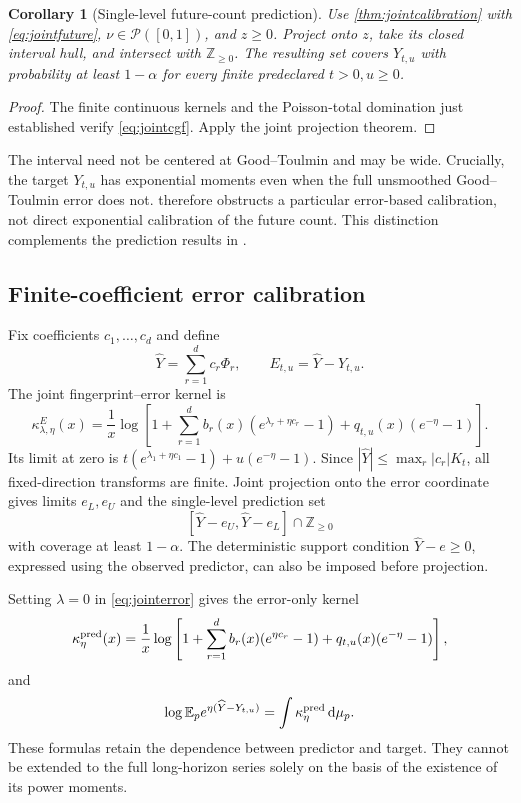 \documentclass[11pt]{article}
\numberwithin{equation}{section}
\newtheorem{corollary}[corollary]{Corollary}
\theoremstyle{definition}
\theoremstyle{remark}
\newcommand{\E}{\mathbb E}
\newcommand{\Prob}{\mathcal P}
\newcommand{\dd}{\,\mathrm d}
\begin{document}
\begin{corollary}[Single-level future-count prediction]\label{cor:jointfuture}
Use \cref{thm:jointcalibration} with \eqref{eq:jointfuture}, $\nu\in\Prob([0,1])$, and $z\ge0$. Project onto $z$, take its closed interval hull, and intersect with $\mathbb Z_{\ge0}$. The resulting set covers $Y_{t,u}$ with probability at least $1-\alpha$ for every finite predeclared $t>0,u\ge0$.
\end{corollary}
\begin{proof}
The finite continuous kernels and the Poisson-total domination just established verify \eqref{eq:jointcgf}. Apply the joint projection theorem.
\end{proof}
The interval need not be centered at Good--Toulmin and may be wide. Crucially, the target $Y_{t,u}$ has exponential moments even when the full unsmoothed Good--Toulmin error does not.  therefore obstructs a particular error-based calibration, not direct exponential calibration of the future count. This distinction complements the prediction results in \cite{Orlitsky2016,Eriksson2026}.

\subsection{Finite-coefficient error calibration}\label{subsec:finiteerror}
Fix coefficients $c_1,\ldots,c_d$ and define
\[
 \widehat Y=\sum_{r=1}^dc_r\Phi_r,\qquad E_{t,u}=\widehat Y-Y_{t,u}.
\]
The joint fingerprint--error kernel is
\begin{equation}\label{eq:jointerror}
 \kappa^E_{\lambda,\eta}(x)
 =\frac1x\log\left[
 1+\sum_{r=1}^db_r(x)(e^{\lambda_r+\eta c_r}-1)
          +q_{t,u}(x)(e^{-\eta}-1)\right].
\end{equation}
Its limit at zero is $t(e^{\lambda_1+\eta c_1}-1)+u(e^{-\eta}-1)$. Since $|\widehat Y|\le\max_r|c_r|K_t$, all fixed-direction transforms are finite. Joint projection onto the error coordinate gives limits $e_L,e_U$ and the single-level prediction set
\begin{equation}\label{eq:jointpredictioninterval}
 [\widehat Y-e_U,\widehat Y-e_L]\cap\mathbb Z_{\ge0}
\end{equation}
with coverage at least $1-\alpha$. The deterministic support condition $\widehat Y-e\ge0$, expressed using the observed predictor, can also be imposed before projection.

Setting $\lambda=0$ in \eqref{eq:jointerror} gives the error-only kernel
\begin{equation}\label{eq:predictionkernel}
 \kappa^{\rm pred}_\eta(x)=\frac1x\log\left[
 1+\sum_{r=1}^db_r(x)(e^{\eta c_r}-1)
        +q_{t,u}(x)(e^{-\eta}-1)\right],
\end{equation}
and
\begin{equation}\label{eq:predictioncgf}
 \log\E_p e^{\eta(\widehat Y-Y_{t,u})}
 =\int\kappa^{\rm pred}_\eta\dd\mu_p.
\end{equation}
These formulas retain the dependence between predictor and target. They cannot be extended to the full long-horizon series solely on the basis of the existence of its power moments.
\end{document}
